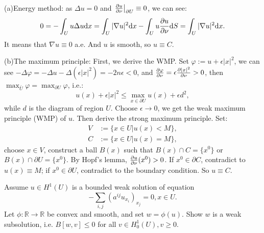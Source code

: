 \begin{solution}
    (a)Energy method: as $\Delta u=0$ and $\left.\frac{\partial u}{\partial \nu}\right|_{\partial U}\equiv 0$, we can see:
    \begin{equation}
        0=-\int_{U}u\Delta u\mathrm{d} x=\int_{U}|\nabla u|^{2}\mathrm{d} x-\int_{U}u\frac{\partial u}{\partial \nu}\mathrm{d} S=\int_{U}|\nabla u|^{2}\mathrm{d} x.
    \end{equation}
    It means that $\nabla u\equiv 0$ a.e. And $u$ is smooth, so $u\equiv C$.

    (b)The maximum principle: First, we derive the WMP. Set $\varphi:=u+\epsilon |x|^{2}$, we can see $-\Delta\varphi=-\Delta u-\Delta(\epsilon |x|^2)=-2n\epsilon<0$, and $\frac{\partial \varphi}{\partial \nu}=\epsilon\frac{\partial |x|^2}{\partial \nu}>0$, then $\max_{\bar{U}}\varphi=\max_{\partial U}\varphi$, i.e.:
    \begin{equation}
        u(x)+\epsilon |x|^{2}\le\max_{x\in\partial U}u(x)+\epsilon d^{2},
    \end{equation}
    while $d$ is the diagram of region $U$. Choose $\epsilon\rightarrow 0$, we get the weak maximum principle (WMP) of $u$. Then derive the strong maximum principle. Set:
    \begin{equation}
        \begin{aligned}
            V&:=\{x\in U|u(x)<M\},\\
            C&:=\{x\in U|u(x)=M\},
        \end{aligned}
    \end{equation}
    choose $x\in V$, construct a ball $B(x)$ such that $B(x)\cap C=\{x^{0}\}$ or $B(x)\cap \partial U=\{x^{0}\}$. By Hopf's lemma, $\frac{\partial u}{\partial \nu}(x^{0})>0$. If $x^{0}\in\partial C$, contradict to $u(x)\equiv M$; if $x^{0}\in\partial U$, contradict to the boundary condition. So $u\equiv C$.
\end{solution}
\begin{exercise}
    Assume $u\in H^{1}(U)$ is a bounded weak solution of equation 
    \begin{equation}
        -\sum_{i,j}\left(a^{ij}u_{x_{i}}\right)_{x_{j}}=0,x\in U.
    \end{equation}
    Let $\phi:\mathbb{R}\rightarrow\mathbb{R}$ be convex and smooth, and set $w=\phi(u)$. Show $w$ is a weak subsolution, i.e. $B[w,v]\le 0$ for all $v\in H_{0}^{1}(U),v\ge 0$. 
\end{exercise}
